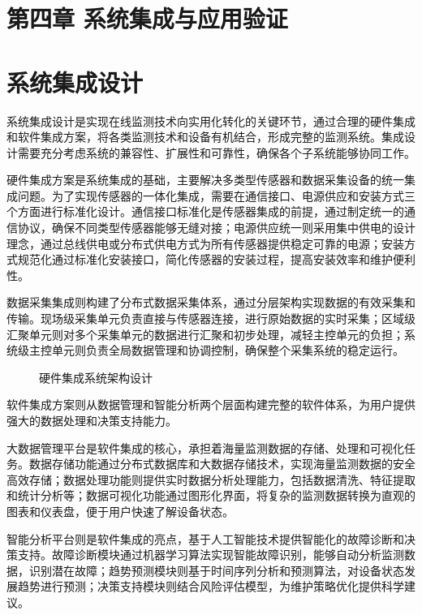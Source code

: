 \section{第四章 系统集成与应用验证}

\section{系统集成设计}

系统集成设计是实现在线监测技术向实用化转化的关键环节，通过合理的硬件集成和软件集成方案，将各类监测技术和设备有机结合，形成完整的监测系统。集成设计需要充分考虑系统的兼容性、扩展性和可靠性，确保各个子系统能够协同工作。

硬件集成方案是系统集成的基础，主要解决多类型传感器和数据采集设备的统一集成问题。为了实现传感器的一体化集成，需要在通信接口、电源供应和安装方式三个方面进行标准化设计。通信接口标准化是传感器集成的前提，通过制定统一的通信协议，确保不同类型传感器能够无缝对接；电源供应统一则采用集中供电的设计理念，通过总线供电或分布式供电方式为所有传感器提供稳定可靠的电源；安装方式规范化通过标准化安装接口，简化传感器的安装过程，提高安装效率和维护便利性。

数据采集集成则构建了分布式数据采集体系，通过分层架构实现数据的有效采集和传输。现场级采集单元负责直接与传感器连接，进行原始数据的实时采集；区域级汇聚单元则对多个采集单元的数据进行汇聚和初步处理，减轻主控单元的负担；系统级主控单元则负责全局数据管理和协调控制，确保整个采集系统的稳定运行。

\begin{figure}[h]
\centering
\caption{硬件集成系统架构设计}
\label{fig:hardware_integration_architecture}
\end{figure}

软件集成方案则从数据管理和智能分析两个层面构建完整的软件体系，为用户提供强大的数据处理和决策支持能力。

大数据管理平台是软件集成的核心，承担着海量监测数据的存储、处理和可视化任务。数据存储功能通过分布式数据库和大数据存储技术，实现海量监测数据的安全高效存储；数据处理功能则提供实时数据分析处理能力，包括数据清洗、特征提取和统计分析等；数据可视化功能通过图形化界面，将复杂的监测数据转换为直观的图表和仪表盘，便于用户快速了解设备状态。

智能分析平台则是软件集成的亮点，基于人工智能技术提供智能化的故障诊断和决策支持。故障诊断模块通过机器学习算法实现智能故障识别，能够自动分析监测数据，识别潜在故障；趋势预测模块则基于时间序列分析和预测算法，对设备状态发展趋势进行预测；决策支持模块则结合风险评估模型，为维护策略优化提供科学建议。

